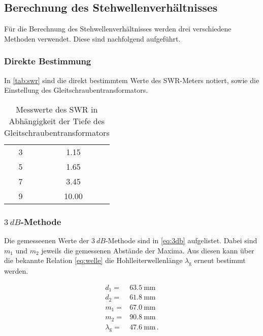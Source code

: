 \subsection{Berechnung des Stehwellenverhältnisses}
\label{ssec:a4}

Für die Berechnung des Stehwellenverhältnisses werden drei verschiedene Methoden verwendet.
Diese sind nachfolgend aufgeführt.

\subsubsection{Direkte Bestimmung}
\label{sssec:a5}

In \autoref{tab:swr} sind die direkt bestimmtem Werte des SWR-Meters notiert, sowie die Einstellung des Gleitschraubentransformators.

\begin{table}
    \centering
    \caption{Messwerte des SWR in Abhängigkeit der Tiefe des Gleitschraubentransformators}
    \label{tab:swr}
    \begin{tabular}{S[table-format=1.0] S[table-format=1.2]}
        \toprule
         &  \\
         & 1.15 \\
        5 & 1.65 \\
        7 & 3.45 \\
        9 & 10.00 \\
        \bottomrule
    \end{tabular}
\end{table}

\subsubsection{$\SI{3}{dB}$-Methode}
\label{sssec:a6}

Die gemesseenen Werte der $\SI{3}{dB}$-Methode sind in \autoref{eq:3db} aufgelistet.
Dabei sind $m_1$ und $m_2$ jeweils die gemessenen Abstände der Maxima.
Aus diesen kann über die bekannte Relation \autoref{eq:welle} die Hohlleiterwellenlänge $\lambda _\text{g}$ erneut bestimmt werden.

\begin{align}
    d_1 =& \SI{63.5}{\milli\meter} \\
    d_2 =& \SI{61.8}{\milli\meter} \\
    m_1 =& \SI{67.0}{\milli\meter} \\
    m_2 =& \SI{90.8}{\milli\meter} \\
    \lambda _\text{g} =& \SI{47.6}{\milli\meter} \, .
    \label{eq:3db}
\end{align}

